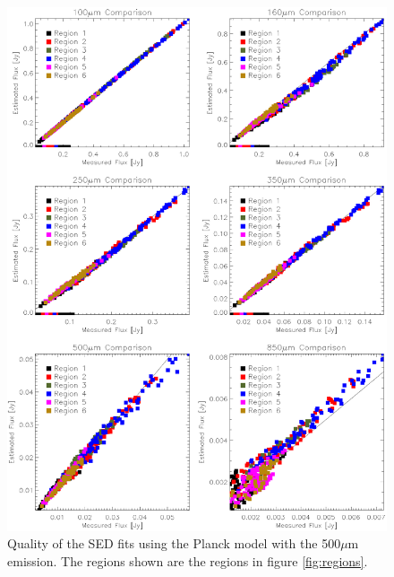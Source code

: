 \begin{figure}
  \centering
  \includegraphics[width=1.\textwidth]{sed_imgs/flux_compare_2_5.eps}
  \caption[Li and Draine Model SED Fit Quality Using 500$\mu$m Data]{Quality of the SED fits using the Planck model with the 500$\mu$m emission.  The regions shown are the regions in figure \ref{fig:regions}.}
  \label{fig:w2_5}
\end{figure}

